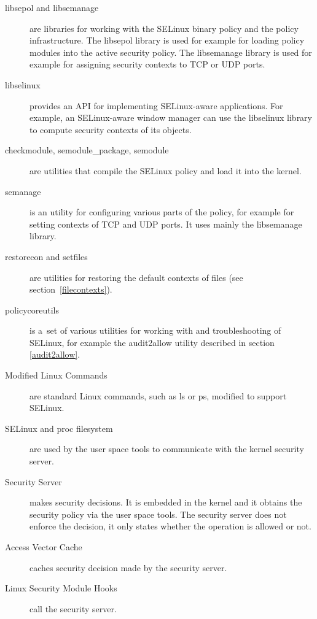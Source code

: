 \begin{description}
    \item [libsepol and libsemanage] are libraries for working with the SELinux
        binary policy and the policy infrastructure. The libsepol library is
        used for example for loading policy modules into the active security
        policy. The libsemanage library is used for example for assigning
        security contexts to TCP or UDP ports.
    \item [libselinux] provides an API for implementing SELinux-aware
        applications. For example, an SELinux-aware window manager can use the
        libselinux library to compute security contexts of its objects.
    \item [checkmodule, semodule\_package, semodule] are utilities that compile
        the SELinux policy and load it into the kernel.
    \item [semanage] is an utility for configuring various parts of the policy,
        for example for setting contexts of TCP and UDP ports. It uses mainly
        the libsemanage library.
    \item [restorecon and setfiles] are utilities for restoring the default
        contexts of files (see section~\ref{filecontexts}).
    \item [policycoreutils] is a~set of various utilities for working with and
        troubleshooting of SE\-Li\-nux, for example the audit2allow utility
        described in section \ref{audit2allow}.
    \item [Modified Linux Commands] are standard Linux commands, such as ls or
        ps, modified to support SELinux.
    \item [SELinux and proc filesystem] are used by the user space tools to
        communicate with the kernel security server.
    \item [Security Server] makes security decisions. It is embedded in the
        kernel and it obtains the security policy via the user space tools.
        The security server does not enforce the decision, it only states
        whether the operation is allowed or not.
    \item [Access Vector Cache] caches security decision made by the security
        server.
    \item [Linux Security Module Hooks] call the security server.
\end{description}

